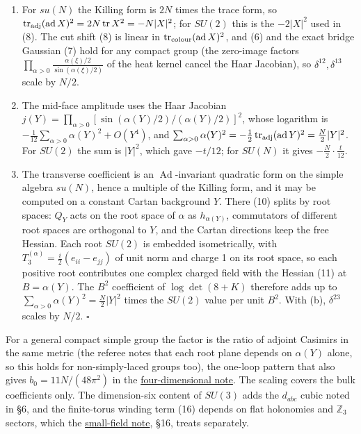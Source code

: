 \documentclass[11pt,a4paper]{article}
\begin{document}
\begin{enumerate}
\def\labelenumi{(\alph{enumi})}
\item
  For \(su(N)\) the Killing form is \(2N\) times the trace form, so
  \(\operatorname{tr}_{\rm adj}(\operatorname{ad}X)^2=2N\operatorname{tr}X^2=-N|X|^2\);
  for \(SU(2)\) this is the \(-2|X|^2\) used in (8). The cut shift (8)
  is linear in \(\operatorname{tr}_{\rm colour}(\operatorname{ad}X)^2\),
  and (6) and the exact bridge Gaussian (7) hold for any compact group
  (the zero-image factors
  \(\prod_{\alpha>0}\frac{\alpha(\xi)/2}{\sin(\alpha(\xi)/2)}\) of the
  heat kernel cancel the Haar Jacobian), so \(\delta^{12},\delta^{13}\)
  scale by \(N/2\).
\item
  The mid-face amplitude uses the Haar Jacobian
  \(j(Y)=\prod_{\alpha>0}[\sin(\alpha(Y)/2)/(\alpha(Y)/2)]^2\), whose
  logarithm is \(-\frac1{12}\sum_{\alpha>0}\alpha(Y)^2+O(Y^4)\), and
  \(\sum_{\alpha>0}\alpha(Y)^2=-\frac12\operatorname{tr}_{\rm adj}(\operatorname{ad}Y)^2=\frac N2|Y|^2\).
  For \(SU(2)\) the sum is \(|Y|^2\), which gave \(-t/12\); for
  \(SU(N)\) it gives \(-\frac N2\cdot\frac t{12}\).
\item
  The transverse coefficient is an \(\operatorname{Ad}\)-invariant
  quadratic form on the simple algebra \(su(N)\), hence a multiple of
  the Killing form, and it may be computed on a constant Cartan
  background \(Y\). There (10) splits by root spaces: \(Q_Y\) acts on
  the root space of \(\alpha\) as \(h_{\alpha(Y)}\), commutators of
  different root spaces are orthogonal to \(Y\), and the Cartan
  directions keep the free Hessian. Each root \(SU(2)\) is embedded
  isometrically, with \(T_3^{(\alpha)}=\frac i2(e_{ii}-e_{jj})\) of unit
  norm and charge 1 on its root space, so each positive root contributes
  one complex charged field with the Hessian (11) at \(B=\alpha(Y)\).
  The \(B^2\) coefficient of \(\log\det(8+K)\) therefore adds up to
  \(\sum_{\alpha>0}\alpha(Y)^2=\frac N2|Y|^2\) times the \(SU(2)\) value
  per unit \(B^2\). With (b), \(\delta^{23}\) scales by \(N/2\).
  \(\square\)
\end{enumerate}

For a general compact simple group the factor is the ratio of adjoint
Casimirs in the same metric (the referee notes that each root plane
depends on \(\alpha(Y)\) alone, so this holds for non-simply-laced
groups too), the one-loop pattern that also gives \(b_0=11N/(48\pi^2)\)
in the \href{four-dimensional-parallel-log.md}{four-dimensional note}.
The scaling covers the bulk coefficients only. The dimension-six content
of \(SU(3)\) adds the \(d_{abc}\) cubic noted in §6, and the
finite-torus winding term (16) depends on flat holonomies and
\(\mathbb Z_3\) sectors, which the
\href{su2-midplane-small-field.md}{small-field note}, §16, treats
separately.
\end{document}
